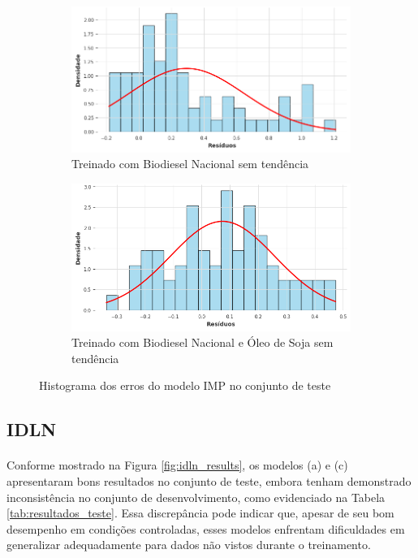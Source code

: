 \begin{figure}[htbp]
	\begin{subfigure}[b]{0.40\textwidth}
		\centering
		\includegraphics[width=\textwidth]{figuras/imp_brasil_detrend_residuals_histogram.png} %
		\caption{Treinado com Biodiesel Nacional sem tendência}
		\label{fig:imp_brasil_detrend_residuals_histogram}
	\end{subfigure}
	\hfill
	\begin{subfigure}[b]{0.40\textwidth}
		\centering
		\includegraphics[width=\textwidth]{figuras/imp_brasil_oil_detrend_residuals_histogram.png} %
		\caption{Treinado com Biodiesel Nacional e Óleo de Soja sem tendência}
		\label{fig:imp_brasil_oil_detrend_residuals_histogram}
	\end{subfigure}

	\caption{Histograma dos erros do modelo \acs{IMP} no conjunto de teste}
	\label{fig:imp_residuals_histogram}
\end{figure}

\subsection{\acs{IDLN}}
\paragraph{} Conforme mostrado na Figura \ref{fig:idln_results}, os modelos (a) e (c) apresentaram bons resultados no conjunto de teste, embora tenham demonstrado inconsistência no conjunto de desenvolvimento, como evidenciado na Tabela \ref{tab:resultados_teste}. Essa discrepância pode indicar que, apesar de seu bom desempenho em condições controladas, esses modelos enfrentam dificuldades em generalizar adequadamente para dados não vistos durante o treinamento.
